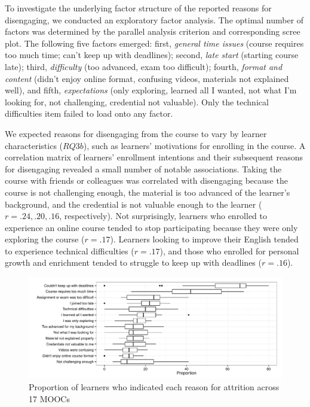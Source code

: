 \documentclass{sigchi}\usepackage[]{graphicx}\usepackage[]{color}
\makeatletter
\def\maxwidth{ %
  \ifdim\Gin@nat@width>\linewidth
    \linewidth
  \else
    \Gin@nat@width
  \fi
}
\newenvironment{knitrout}{}{} %
\makeatother
\begin{document}
To investigate the underlying factor structure of the reported reasons for disengaging, we conducted an exploratory factor analysis. The optimal number of factors was determined by the parallel analysis criterion and corresponding scree plot. The following five factors emerged: first, {\em general time issues} (course requires too much time; can't keep up with deadlines); second, {\em late start} (starting course late); third, {\em  difficulty} (too advanced, exam too difficult); fourth, {\em format and content} (didn't enjoy online format, confusing videos, materials not explained well), and fifth, {\em expectations} (only exploring, learned all I wanted, not what I'm looking for, not challenging, credential not valuable). Only the technical difficulties item failed to load onto any factor.

We expected reasons for disengaging from the course to vary by learner characteristics ($RQ3b$), such as learners' motivations for enrolling in the course. A correlation matrix of learners' enrollment intentions and their subsequent reasons for disengaging revealed a small number of notable associations. Taking the course with friends or colleagues was correlated with disengaging because the course is not challenging enough, the material is too advanced of the learner's background, and the credential is not valuable enough to the learner ($r=.24, .20, .16$, respectively). Not surprisingly, learners who enrolled to experience an online course tended to stop participating because they were only exploring the course ($r=.17$). Learners looking to improve their English tended to experience technical difficulties ($r=.17$), and those who enrolled for personal growth and enrichment tended to struggle to keep up with deadlines ($r=.16$).

\begin{knitrout}
\color{fgcolor}\begin{figure}[ht]

\includegraphics[width=\maxwidth]{figure/s1reason} \caption[Proportion of learners who indicated each reason for attrition across 17 MOOCs]{Proportion of learners who indicated each reason for attrition across 17 MOOCs\label{fig:s1reason}}
\end{figure}


\end{knitrout}
\end{document}
